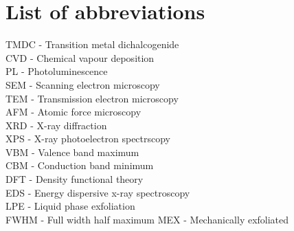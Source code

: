 \section*{List of abbreviations}

TMDC - Transition metal dichalcogenide\\
CVD - Chemical vapour deposition\\
PL - Photoluminescence\\
SEM - Scanning electron microscopy\\
TEM - Transmission electron microscopy\\
AFM - Atomic force microscopy\\
XRD - X-ray diffraction\\
XPS - X-ray photoelectron spectrscopy\\
VBM - Valence band maximum\\
CBM - Conduction band minimum\\
DFT - Density functional theory\\
EDS - Energy dispersive x-ray spectroscopy\\
LPE - Liquid phase exfoliation\\
FWHM - Full width half maximum
MEX - Mechanically exfoliated